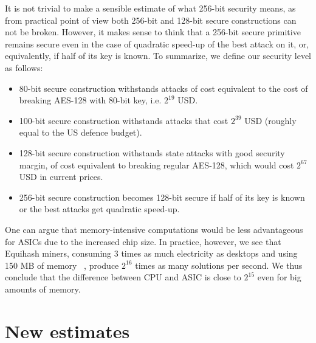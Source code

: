 \documentclass[a4paper]{article}
\begin{document}
It is not trivial to make a sensible estimate of what 256-bit security means, as from practical point of view both 256-bit and 128-bit secure constructions can not be broken. However, it makes sense to think that a 256-bit secure primitive remains secure even in the case of quadratic speed-up of the best attack on it, or, equivalently, if half of its key is known. To summarize, we define our security level as follows:
\begin{itemize}
    \item 80-bit secure construction withstands attacks of cost  equivalent to the cost of breaking AES-128 with 80-bit key, i.e. $2^{19}$ USD.
    \item 100-bit secure construction withstands attacks that cost $2^{39}$ USD (roughly equal to the US defence budget).
    \item 128-bit secure construction withstands state attacks with good security margin, of cost equivalent to breaking regular AES-128, which would cost $2^{67}$ USD in current prices.
    \item 256-bit secure construction becomes 128-bit secure if half of its key is known or the best attacks get quadratic speed-up.
\end{itemize}

One can argue that memory-intensive computations would be less advantageous for ASICs due to the increased chip size. In practice, however, we see that Equihash miners, consuming 3 times as much electricity as desktops and using 150 MB of memory ~\cite{equihashminer}, produce $2^{16}$ times as many solutions per second. We thus conclude that the difference between CPU and ASIC is close to $2^{15}$ even for big amounts of memory.
 
 
 
 
 \section{New estimates}
 
\end{document}
